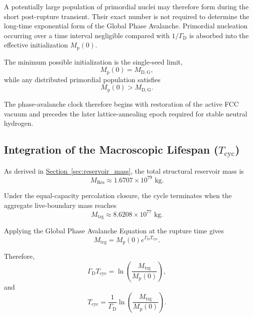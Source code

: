 A potentially large population of primordial nuclei may therefore form during the short post-rupture transient. Their exact number is not required to determine the long-time exponential form of the Global Phase Avalanche. Primordial nucleation occurring over a time interval negligible compared with $1/\Gamma_{\mathrm{D}}$ is absorbed into the effective initialization $M_{\mathrm{p}}(0)$.

The minimum possible initialization is the single-seed limit,
\begin{equation}
    M_{\mathrm{p}}(0)
    =
    M_{\mathrm{D,G}},
\end{equation}
while any distributed primordial population satisfies
\begin{equation}
    M_{\mathrm{p}}(0)
    >
    M_{\mathrm{D,G}}.
\end{equation}

The phase-avalanche clock therefore begins with restoration of the active FCC vacuum and precedes the later lattice-annealing epoch required for stable neutral hydrogen.

\subsection{Integration of the Macroscopic Lifespan ($T_{\mathrm{cyc}}$)}

As derived in \hyperref[sec:reservoir_mass]{Section~\ref*{sec:reservoir_mass}}, the total structural reservoir mass is
\begin{equation}
    M_{\mathrm{Res}}
    \approx
    1.6707\times10^{79}
    \text{ kg}.
\end{equation}

Under the equal-capacity percolation closure, the cycle terminates when the aggregate live-boundary mass reaches
\begin{equation}
    M_{\mathrm{trg}}
    \approx
    8.6208\times10^{77}
    \text{ kg}.
\end{equation}

Applying the Global Phase Avalanche Equation at the rupture time gives
\begin{equation}
    M_{\mathrm{trg}}
    =
    M_{\mathrm{p}}(0)
    e^{\Gamma_{\mathrm{D}}T_{\mathrm{cyc}}}.
\end{equation}

Therefore,
\begin{equation}
    \Gamma_{\mathrm{D}}T_{\mathrm{cyc}}
    =
    \ln\left(
        \frac{M_{\mathrm{trg}}}
        {M_{\mathrm{p}}(0)}
    \right),
\end{equation}
and
\begin{equation}
    T_{\mathrm{cyc}}
    =
    \frac{1}{\Gamma_{\mathrm{D}}}
    \ln\left(
        \frac{M_{\mathrm{trg}}}
        {M_{\mathrm{p}}(0)}
    \right).
\end{equation}

